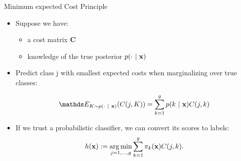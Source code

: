 \documentclass[11pt,compress,t,notes=noshow, aspectratio=169, xcolor=table]{beamer}
\begin{document}
\begin{frame}{Minimum expected Cost Principle}


		\begin{itemize}
		
			\item Suppose we have:
            \begin{itemize}
                \item a cost matrix $\mathbf{C}$
                
                \item knowledge of the true posterior $p(\cdot ~|~ \mathbf{x})$
            \end{itemize}

                

			\item Predict class j with smallest expected costs when marginalizing over true classes:
	
			$$ 	\E_{K \sim p(\cdot ~|~ \xv)}( C(j,K) ) = \sumkg p(k ~|~ \xv) C(j,k)	$$
	
		\end{itemize}

    \begin{itemize}
        \item If we trust a probabilistic classifier, we can convert its scores to labels:
		$$  h(\mathbf{x}) := \mathop{\mathrm{arg\,min}}\limits_{j=1,\ldots,g} \sum\limits_{k=1}^g 	\pi_{k}(\mathbf{x}) C(j,k). $$
 
        

\end{itemize}
\end{frame}
\end{document}
